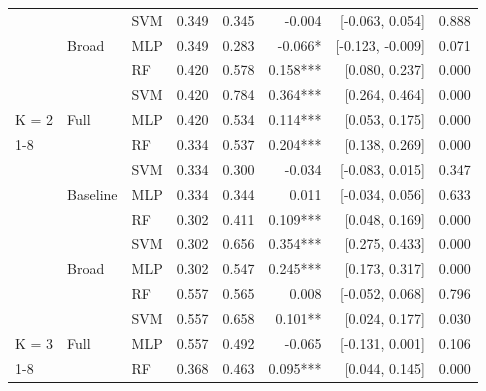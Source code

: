 \begin{table}
\begin{threeparttable}
\begin{tabular}[t]{lllrrrrr}
 &  & SVM & 0.349 & 0.345 & -0.004 & {}[-0.063, 0.054] & 0.888\\

 & \multirow[t]{-2}{*}[\normalbaselineskip]{\raggedright\arraybackslash Broad} & MLP & 0.349 & 0.283 & -0.066* & {}[-0.123, -0.009] & 0.071\\

 &  & RF & 0.420 & 0.578 & 0.158*** & {}[0.080, 0.237] & 0.000\\

 &  & SVM & 0.420 & 0.784 & 0.364*** & {}[0.264, 0.464] & 0.000\\

\multirow[t]{-8}{*}[\normalbaselineskip]{\raggedright\arraybackslash K = 2} & \multirow[t]{-2}{*}[\normalbaselineskip]{\raggedright\arraybackslash Full} & MLP & 0.420 & 0.534 & 0.114*** & {}[0.053, 0.175] & 0.000\\
\cmidrule{1-8}
 &  & RF & 0.334 & 0.537 & 0.204*** & {}[0.138, 0.269] & 0.000\\

 &  & SVM & 0.334 & 0.300 & -0.034 & {}[-0.083, 0.015] & 0.347\\

 & \multirow[t]{-2}{*}[\normalbaselineskip]{\raggedright\arraybackslash Baseline} & MLP & 0.334 & 0.344 & 0.011 & {}[-0.034, 0.056] & 0.633\\

 &  & RF & 0.302 & 0.411 & 0.109*** & {}[0.048, 0.169] & 0.000\\

 &  & SVM & 0.302 & 0.656 & 0.354*** & {}[0.275, 0.433] & 0.000\\

 & \multirow[t]{-2}{*}[\normalbaselineskip]{\raggedright\arraybackslash Broad} & MLP & 0.302 & 0.547 & 0.245*** & {}[0.173, 0.317] & 0.000\\

 &  & RF & 0.557 & 0.565 & 0.008 & {}[-0.052, 0.068] & 0.796\\

 &  & SVM & 0.557 & 0.658 & 0.101** & {}[0.024, 0.177] & 0.030\\

\multirow[t]{-8}{*}[\normalbaselineskip]{\raggedright\arraybackslash K = 3} & \multirow[t]{-2}{*}[\normalbaselineskip]{\raggedright\arraybackslash Full} & MLP & 0.557 & 0.492 & -0.065 & {}[-0.131, 0.001] & 0.106\\
\cmidrule{1-8}
 &  & RF & 0.368 & 0.463 & 0.095*** & {}[0.044, 0.145] & 0.000\\


\end{tabular}
\end{threeparttable}
\end{table}
